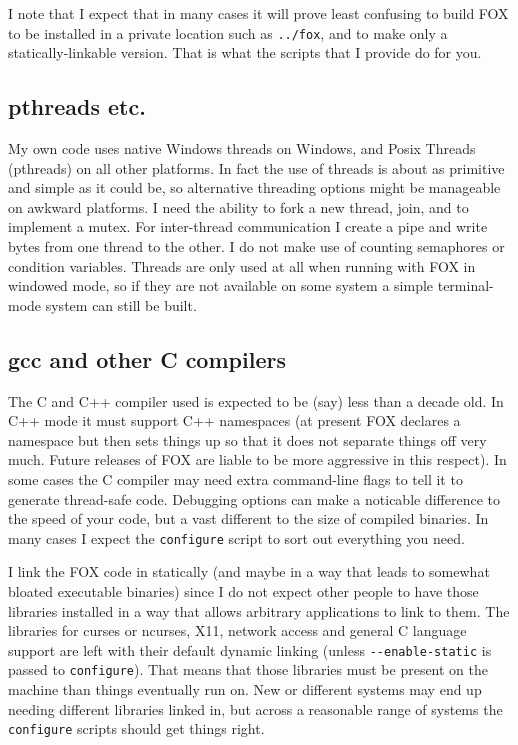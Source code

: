 \documentclass[11pt]{article}
\begin{document}
I note that I expect that in many cases it will prove least confusing to build
FOX to be installed in a private location such as \verb+../fox+, and to
make only a statically-linkable version. That is what the scripts that I
provide do for you.

\subsection{pthreads etc.}
My own code uses native Windows threads on Windows, and Posix Threads
(pthreads) on all other platforms. In fact the use of threads is about
as primitive and simple as it could be, so alternative threading options
might be manageable on awkward platforms. I need the ability to fork
a new thread, join, and to implement a mutex. For inter-thread
communication I create a pipe and write bytes from one thread to
the other. I do not make use of counting semaphores or condition variables.
Threads are only used at all when running with FOX in windowed mode, so if
they are not available on some system a simple terminal-mode system can
still be built. 

\subsection{gcc and other C compilers}
The C and C++ compiler used is expected to be (say) less than a decade
old. In C++ mode it must support C++ namespaces (at present FOX declares
a namespace but then sets things up so that it does not separate things off
very much. Future releases of FOX are liable to be more aggressive in this
respect). In some cases the C compiler may need extra command-line flags
to tell it to generate thread-safe code. Debugging options can make a
noticable difference to the speed of your code, but a vast different to the
size of compiled binaries. In many cases I expect the \verb+configure+ script
to sort out everything you need.

I link the FOX code in statically (and maybe in a way that leads
to somewhat bloated executable binaries) since I do not expect other
people to have those libraries installed in a way that allows arbitrary
applications to link to them. The libraries for curses or ncurses, X11,
network access and general C language support are left with their default
dynamic linking (unless \verb+--enable-static+ is passed to \verb+configure+).
That means that those libraries must be present on the machine than things
eventually run on. New or different systems may end up needing different
libraries linked in, but across a reasonable range of systems the
\verb+configure+ scripts should get things right.
\end{document}
